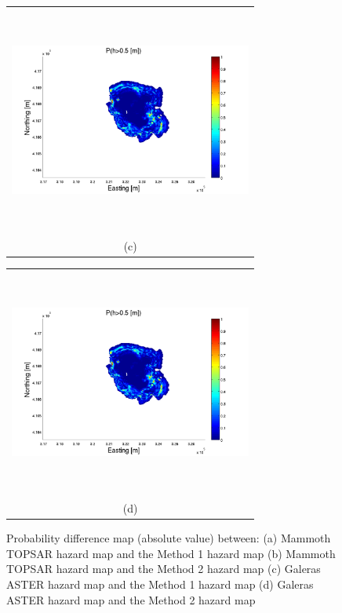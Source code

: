 \documentclass[12pt]{article}
\newcommand{\Pic}[2][0.85]{\begin{center}\texttt{[image: \#2]}
 \end{center} }
\begin{document}
\begin{figure}[H]
\begin{minipage}[b]{0.6\textwidth}
\begin{tabular}{c}
       \includegraphics[width=8cm,height=7.5cm,keepaspectratio]{figs_pdf/Mammoth0_minus_Aster30.pdf}\\
        (c)
        \end{tabular}
    \end{minipage}
    \begin{minipage}{0.6\textwidth}
        \begin{tabular}{c}
	\includegraphics[width=8cm,height=7.5cm,keepaspectratio]{figs_pdf/Mammoth0_minus_Aster30.pdf}\\
        (d)
        \end{tabular}
    \end{minipage} 
    \caption{ Probability difference map (absolute value) between: (a)
      Mammoth TOPSAR hazard map and the Method 1 hazard map (b)
      Mammoth TOPSAR hazard map and the Method 2 hazard map (c)
      Galeras ASTER hazard map and the Method 1 hazard map (d) Galeras
      ASTER hazard map and the Method 2 hazard map}
\label{fig8}  
\end{figure}
\end{document}
